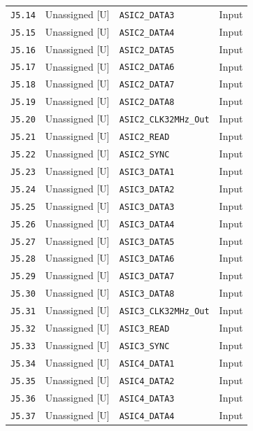 \documentclass[11pt,a4paper]{article}
\begin{document}
\begin{longtable}{@{}P{21mm}P{34mm}P{78mm}P{33mm}@{}}
\nolinkurl{J5.14} & Unassigned [U] & \nolinkurl{ASIC2_DATA3} & Input \\
\nolinkurl{J5.15} & Unassigned [U] & \nolinkurl{ASIC2_DATA4} & Input \\
\nolinkurl{J5.16} & Unassigned [U] & \nolinkurl{ASIC2_DATA5} & Input \\
\nolinkurl{J5.17} & Unassigned [U] & \nolinkurl{ASIC2_DATA6} & Input \\
\nolinkurl{J5.18} & Unassigned [U] & \nolinkurl{ASIC2_DATA7} & Input \\
\nolinkurl{J5.19} & Unassigned [U] & \nolinkurl{ASIC2_DATA8} & Input \\
\nolinkurl{J5.20} & Unassigned [U] & \nolinkurl{ASIC2_CLK32MHz_Out} & Input \\
\nolinkurl{J5.21} & Unassigned [U] & \nolinkurl{ASIC2_READ} & Input \\
\nolinkurl{J5.22} & Unassigned [U] & \nolinkurl{ASIC2_SYNC} & Input \\
\nolinkurl{J5.23} & Unassigned [U] & \nolinkurl{ASIC3_DATA1} & Input \\
\nolinkurl{J5.24} & Unassigned [U] & \nolinkurl{ASIC3_DATA2} & Input \\
\nolinkurl{J5.25} & Unassigned [U] & \nolinkurl{ASIC3_DATA3} & Input \\
\nolinkurl{J5.26} & Unassigned [U] & \nolinkurl{ASIC3_DATA4} & Input \\
\nolinkurl{J5.27} & Unassigned [U] & \nolinkurl{ASIC3_DATA5} & Input \\
\nolinkurl{J5.28} & Unassigned [U] & \nolinkurl{ASIC3_DATA6} & Input \\
\nolinkurl{J5.29} & Unassigned [U] & \nolinkurl{ASIC3_DATA7} & Input \\
\nolinkurl{J5.30} & Unassigned [U] & \nolinkurl{ASIC3_DATA8} & Input \\
\nolinkurl{J5.31} & Unassigned [U] & \nolinkurl{ASIC3_CLK32MHz_Out} & Input \\
\nolinkurl{J5.32} & Unassigned [U] & \nolinkurl{ASIC3_READ} & Input \\
\nolinkurl{J5.33} & Unassigned [U] & \nolinkurl{ASIC3_SYNC} & Input \\
\nolinkurl{J5.34} & Unassigned [U] & \nolinkurl{ASIC4_DATA1} & Input \\
\nolinkurl{J5.35} & Unassigned [U] & \nolinkurl{ASIC4_DATA2} & Input \\
\nolinkurl{J5.36} & Unassigned [U] & \nolinkurl{ASIC4_DATA3} & Input \\
\nolinkurl{J5.37} & Unassigned [U] & \nolinkurl{ASIC4_DATA4} & Input \\

\end{longtable}
\end{document}
